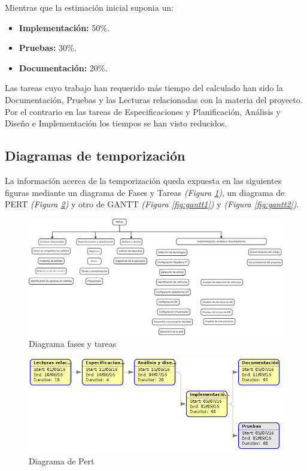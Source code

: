 Mientras que la estimación inicial suponia un:

\begin{itemize}
  \item \textbf{Implementación: }50\%.
  \item \textbf{Pruebas: }30\%.
  \item \textbf{Documentación: }20\%.
\end{itemize}

Las tareas cuyo trabajo han requerido más tiempo del calculado han sido la Documentación, Pruebas y las Lecturas relacionadas con la materia del proyecto. Por el contrario en las tareas de Especificaciones y Planificación, Análisis y Diseño e Implementación los tiempos se han visto reducidos.

\subsection{Diagramas de temporización}

La información acerca de la temporización queda expuesta en las siguientes figuras mediante un diagrama de Fases y Tareas \textit{(Figura \ref{fig:fasestareas})}, un diagrama de PERT \textit{(Figura \ref{fig:pert})} y otro de GANTT \textit{(Figura \ref{fig:gantt1})} y \textit{(Figura \ref{fig:gantt2})}.

\begin{figure}[!ht]
  \begin{center}
    \includegraphics[scale=0.30]{../images/diag_plan/fases_tareas.png}
    \caption{Diagrama fases y tareas}
    \label{fig:fasestareas}
  \end{center}
\end{figure}

\newpage
\begin{figure}[!ht]
  \begin{center}
    \includegraphics[width=1\textwidth]{../images/diag_plan/pert.png}
    \caption{Diagrama de Pert}
    \label{fig:pert}
  \end{center}
\end{figure}

